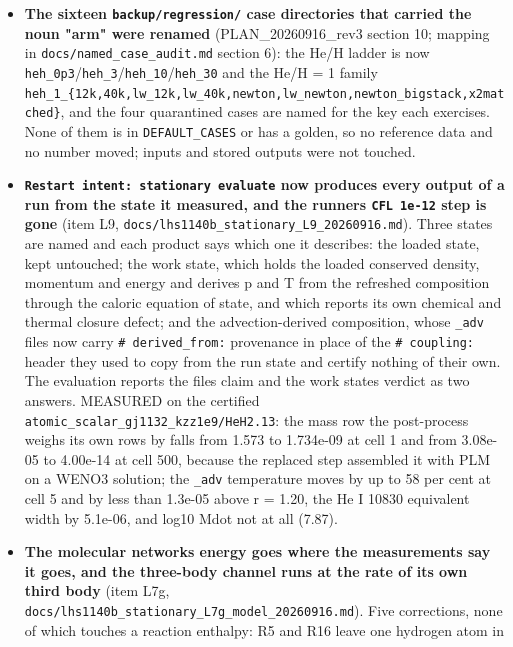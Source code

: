 \documentclass[english,a4paper]{my_memo}
\begin{document}
\begin{itemize}
\item
  \textbf{The sixteen \texttt{backup/regression/} case directories that carried the noun
  "arm" were renamed} (PLAN\_20260916\_rev3 section 10; mapping in
  \texttt{docs/named\_case\_audit.md} section 6): the He/H ladder is now
  \texttt{heh\_0p3}/\texttt{heh\_3}/\texttt{heh\_10}/\texttt{heh\_30} and the He/H = 1 family
  \texttt{heh\_1\_\{12k,40k,lw\_12k,lw\_40k,newton,lw\_newton,newton\_bigstack,x2matched\}},
  and the four quarantined cases are named for the key each exercises. None of
  them is in \texttt{DEFAULT\_CASES} or has a golden, so no reference data and no
  number moved; inputs and stored outputs were not touched.
\item
  \textbf{\texttt{Restart\ intent:\ stationary\ evaluate} now produces every output of a run
  from the state it measured, and the runner\textquotesingle s \texttt{CFL\ 1e-12} step is gone}
  (item L9, \texttt{docs/lhs1140b\_stationary\_L9\_20260916.md}). Three states are named
  and each product says which one it describes: the loaded state, kept
  untouched; the work state, which holds the loaded conserved density,
  momentum and energy and derives p and T from the refreshed composition
  through the caloric equation of state, and which reports its own chemical
  and thermal closure defect; and the advection-derived composition, whose
  \texttt{\_adv} files now carry \texttt{\#\ derived\_from:} provenance in place of the
  \texttt{\#\ coupling:} header they used to copy from the run state and certify
  nothing of their own. The evaluation reports the file\textquotesingle s claim and the work
  state\textquotesingle s verdict as two answers. MEASURED on the certified
  \texttt{atomic\_scalar\_gj1132\_kzz1e9/HeH2.13}: the mass row the post-process weighs
  its own rows by falls from 1.573 to 1.734e-09 at cell 1 and from 3.08e-05 to
  4.00e-14 at cell 500, because the replaced step assembled it with PLM on a
  WENO3 solution; the \texttt{\_adv} temperature moves by up to 58 per cent at cell 5
  and by less than 1.3e-05 above r = 1.20, the He I 10830 equivalent width by
  5.1e-06, and log10 Mdot not at all (7.87).
\item
  \textbf{The molecular network\textquotesingle s energy goes where the measurements say it goes, and
  the three-body channel runs at the rate of its own third body} (item L7g,
  \texttt{docs/lhs1140b\_stationary\_L7g\_model\_20260916.md}). Five corrections, none of
  which touches a reaction enthalpy: R5 and R16 leave one hydrogen atom in

\end{itemize}
\end{document}
